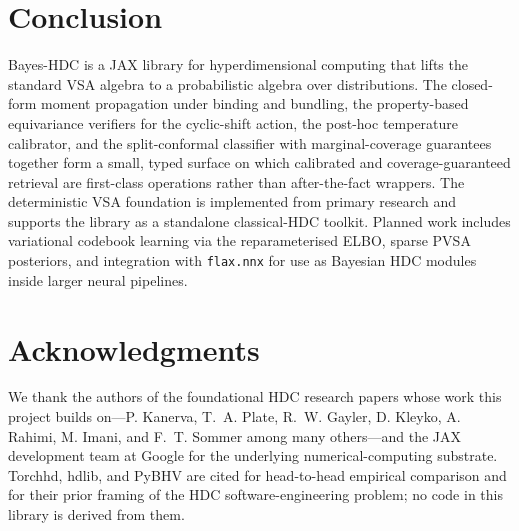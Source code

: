 \documentclass[twoside,11pt]{article}
\begin{document}
\section{Conclusion}
\label{sec:conclusion}

Bayes-HDC is a JAX library for hyperdimensional computing that lifts the standard VSA algebra to a probabilistic algebra over distributions. The closed-form moment propagation under binding and bundling, the property-based equivariance verifiers for the cyclic-shift action, the post-hoc temperature calibrator, and the split-conformal classifier with marginal-coverage guarantees together form a small, typed surface on which calibrated and coverage-guaranteed retrieval are first-class operations rather than after-the-fact wrappers. The deterministic VSA foundation is implemented from primary research and supports the library as a standalone classical-HDC toolkit. Planned work includes variational codebook learning via the reparameterised ELBO, sparse PVSA posteriors, and integration with \texttt{flax.nnx} for use as Bayesian HDC modules inside larger neural pipelines.

\section*{Acknowledgments}

We thank the authors of the foundational HDC research papers whose work this project builds on---P. Kanerva, T.~A. Plate, R.~W. Gayler, D. Kleyko, A. Rahimi, M. Imani, and F.~T. Sommer among many others---and the JAX development team at Google for the underlying numerical-computing substrate. Torchhd, hdlib, and PyBHV are cited for head-to-head empirical comparison and for their prior framing of the HDC software-engineering problem; no code in this library is derived from them.
\end{document}
